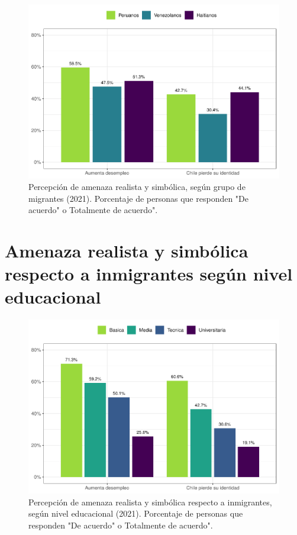 \documentclass[
  12pt,
  openany]{book}
\begin{document}
\begin{figure}

{\centering \includegraphics{reporte-elsoc_files/figure-latex/amen-wave-1} 

}

\caption{Percepción de amenaza realista y simbólica, según grupo de migrantes (2021). Porcentaje de personas que responden "De acuerdo" o Totalmente de acuerdo".}\label{fig:amen-wave}
\end{figure}

\hypertarget{amenaza-realista-y-simbuxf3lica-respecto-a-inmigrantes-seguxfan-nivel-educacional}{%
\section{Amenaza realista y simbólica respecto a inmigrantes según nivel educacional}\label{amenaza-realista-y-simbuxf3lica-respecto-a-inmigrantes-seguxfan-nivel-educacional}}

\begin{figure}

{\centering \includegraphics{reporte-elsoc_files/figure-latex/amen-educ-1} 

}

\caption{Percepción de amenaza realista y simbólica respecto a inmigrantes, según nivel educacional (2021). Porcentaje de personas que responden "De acuerdo" o Totalmente de acuerdo".}\label{fig:amen-educ}
\end{figure}
\end{document}
